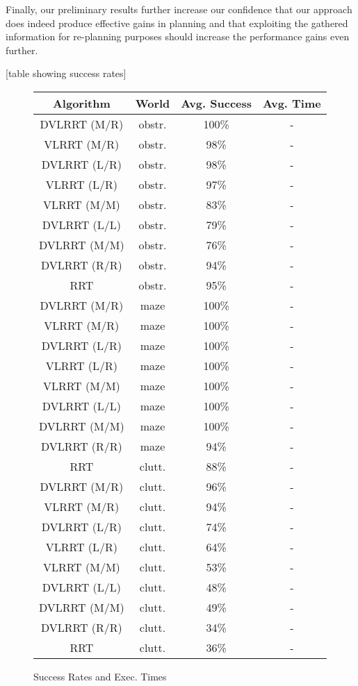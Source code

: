 \documentclass[10pt,twoside,twocolumn]{article}
\begin{document}
Finally, our preliminary results further increase our confidence that our approach does indeed produce effective gains in
planning and that exploiting the gathered information for re-planning purposes should increase the performance gains
even further.

[table showing success rates]
\begin{figure}[tp]
\small{
\begin{tabular}{|cccc|}
\hline
Algorithm & World & Avg. Success & Avg. Time\\
\hline
DVLRRT (M/R) & obstr. & 100\% & -\\
VLRRT (M/R) & obstr. & 98\% & - \\
DVLRRT (L/R) & obstr. & 98\% & - \\
VLRRT (L/R) & obstr. & 97\% & -\\
VLRRT (M/M) & obstr. & 83\% & -\\
DVLRRT (L/L) & obstr. & 79\% & -\\
DVLRRT (M/M) & obstr. & 76\% & -\\
DVLRRT (R/R) & obstr. & 94\% & -\\
RRT & obstr. & 95\% & -\\
DVLRRT (M/R) & maze & 100\% & -\\
VLRRT (M/R) & maze & 100\% & - \\
DVLRRT (L/R) & maze & 100\% & - \\
VLRRT (L/R) & maze & 100\% & -\\
VLRRT (M/M) & maze & 100\% & -\\
DVLRRT (L/L) & maze & 100\% & -\\
DVLRRT (M/M) & maze & 100\% & -\\
DVLRRT (R/R) & maze & 94\% & -\\
RRT & clutt. & 88\% & -\\
DVLRRT (M/R) & clutt. & 96\% & -\\
VLRRT (M/R) & clutt. & 94\% & - \\
DVLRRT (L/R) & clutt. & 74\% & - \\
VLRRT (L/R) & clutt. & 64\% & -\\
VLRRT (M/M) & clutt. & 53\% & -\\
DVLRRT (L/L) & clutt. & 48\% & -\\
DVLRRT (M/M) & clutt. & 49\% & -\\
DVLRRT (R/R) & clutt. & 34\% & -\\
RRT & clutt. & 36\% & -\\
\hline
\end{tabular}}
\caption{Success Rates and Exec. Times}
\end{figure}
\end{document}
